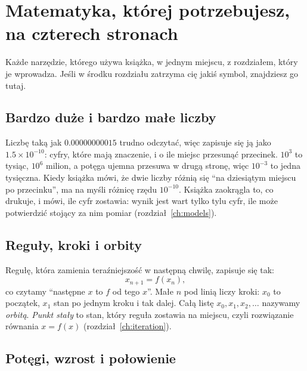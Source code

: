 
\chapter{Matematyka, której potrzebujesz, na czterech stronach}
\label{app:toolkit}

\noindent
Każde narzędzie, którego używa książka, w jednym miejscu, z rozdziałem, który
je wprowadza. Jeśli w środku rozdziału zatrzyma cię jakiś symbol, znajdziesz
go tutaj.

\section{Bardzo duże i bardzo małe liczby}
\label{sec:appc-numbers}

\noindent
Liczbę taką jak $\num{0.00000000015}$ trudno odczytać, więc zapisuje się ją
jako $\num{1.5} \times 10^{-10}$: cyfry, które mają znaczenie, i o ile miejsc
przesunąć przecinek. $10^{3}$ to tysiąc, $10^{6}$ milion, a potęga ujemna
przesuwa w drugą stronę, więc $10^{-3}$ to jedna tysięczna. Kiedy książka
mówi, że dwie liczby różnią się \enquote{na dziesiątym miejscu po
przecinku}, ma na myśli różnicę rzędu $10^{-10}$. Książka zaokrągla to, co
drukuje, i mówi, ile cyfr zostawia: wynik jest wart tylko tylu cyfr, ile może
potwierdzić stojący za nim pomiar (rozdział~\ref{ch:models}).

\section{Reguły, kroki i orbity}
\label{sec:appc-steps}

\noindent
Regułę, która zamienia teraźniejszość w następną chwilę, zapisuje się tak:
\[ x_{n+1} = f(x_{n}), \]
co czytamy \enquote{następne $x$ to $f$ od tego $x$}. Małe $n$ pod linią
liczy kroki: $x_{0}$ to początek, $x_{1}$ stan po jednym kroku i tak dalej.
Całą listę $x_{0}, x_{1}, x_{2}, \ldots$ nazywamy \emph{orbitą}.
\emph{Punkt stały} to stan, który reguła zostawia na miejscu, czyli
rozwiązanie równania $x = f(x)$ (rozdział~\ref{ch:iteration}).

\section{Potęgi, wzrost i połowienie}
\label{sec:appc-powers}

